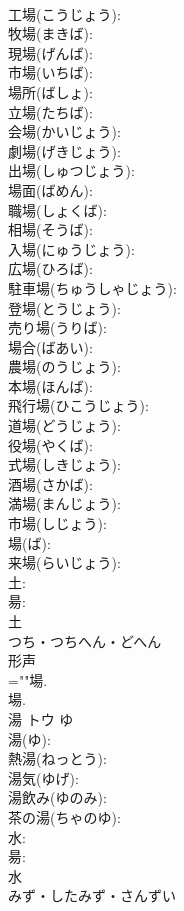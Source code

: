\documentclass[8pt]{extreport}
\begin{document}
\begin{CJK}{UTF8}{min}
\\	工場(こうじょう): 
\\	牧場(まきば): 
\\	現場(げんば): 
\\	市場(いちば): 
\\	場所(ばしょ): 
\\	立場(たちば): 
\\	会場(かいじょう): 
\\	劇場(げきじょう): 
\\	出場(しゅつじょう): 
\\	場面(ばめん): 
\\	職場(しょくば): 
\\	相場(そうば): 
\\	入場(にゅうじょう): 
\\	広場(ひろば): 
\\	駐車場(ちゅうしゃじょう): 
\\	登場(とうじょう): 
\\	売り場(うりば): 
\\	場合(ばあい): 
\\	農場(のうじょう): 
\\	本場(ほんば): 
\\	飛行場(ひこうじょう): 
\\	道場(どうじょう): 
\\	役場(やくば): 
\\	式場(しきじょう): 
\\	酒場(さかば): 
\\	満場(まんじょう): 
\\	市場(しじょう): 
\\	場(ば): 
\\	来場(らいじょう): 
\\	土: 
\\	昜: 
\\	土	
\\	つち・つちへん・どへん	
\\	形声 
\\	=""場.
\\	場.
\\	湯	トウ	ゆ		
\\	湯(ゆ): 
\\	熱湯(ねっとう): 
\\	湯気(ゆげ): 
\\	湯飲み(ゆのみ): 
\\	茶の湯(ちゃのゆ): 
\\	水: 
\\	昜: 
\\	水	
\\	みず・したみず・さんずい	

\end{CJK}
\end{document}
